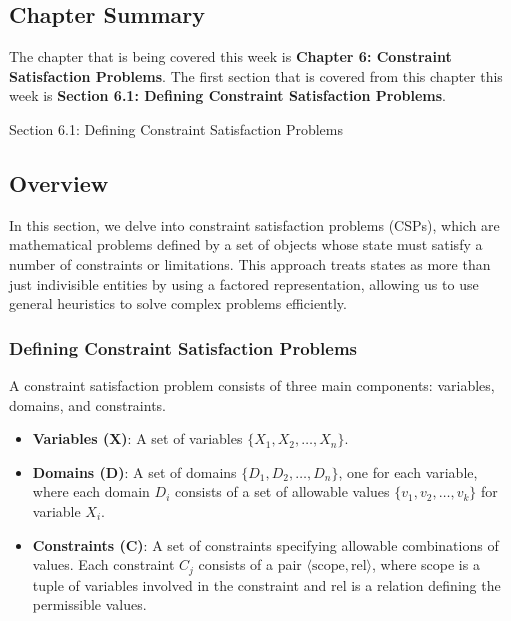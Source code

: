 \subsection{Chapter Summary}

The chapter that is being covered this week is \textbf{Chapter 6: Constraint Satisfaction Problems}. The first section that is covered from this chapter this week is \textbf{Section 6.1: Defining Constraint Satisfaction Problems}.

\begin{notes}{Section 6.1: Defining Constraint Satisfaction Problems}
    \subsection*{Overview}

    In this section, we delve into constraint satisfaction problems (CSPs), which are mathematical problems defined by a set of objects whose state must satisfy a number of constraints or limitations. 
    This approach treats states as more than just indivisible entities by using a factored representation, allowing us to use general heuristics to solve complex problems efficiently.
    
    \subsubsection*{Defining Constraint Satisfaction Problems}
    
    A constraint satisfaction problem consists of three main components: variables, domains, and constraints.
    
    \begin{highlight}
    
        \begin{itemize}
            \item \textbf{Variables (X)}: A set of variables $\{X_1, X_2, \ldots, X_n\}$.
            \item \textbf{Domains (D)}: A set of domains $\{D_1, D_2, \ldots, D_n\}$, one for each variable, where each domain $D_i$ consists of a set of allowable values $\{v_1, v_2, \ldots, v_k\}$ for variable $X_i$.
            \item \textbf{Constraints (C)}: A set of constraints specifying allowable combinations of values. Each constraint $C_j$ consists of a pair $\langle \text{scope}, \text{rel} \rangle$, 
            where scope is a tuple of variables involved in the constraint and rel is a relation defining the permissible values.
        \end{itemize}
    

\end{highlight}
\end{notes}
